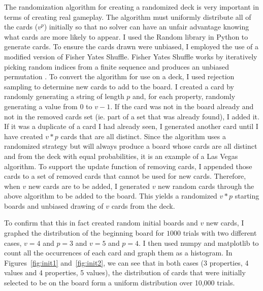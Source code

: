 \documentclass[pageno]{jpaper}
\begin{document}
The randomization algorithm for creating a randomized deck is very important in terms of creating real gameplay. The algorithm must uniformly distribute all of the cards ($v^p$) initially so that no solver can have an unfair advantage knowing what cards are more likely to appear. I used the Random library in Python to generate cards. To ensure the cards drawn were unbiased, I employed the use of a modified version of Fisher Yates Shuffle. Fisher Yates Shuffle works by iteratively picking random indices from a finite sequence and produces an unbiased permutation \cite{fisher}. To convert the algorithm for use on a deck, I used rejection sampling to determine new cards to add to the board. I created a card by randomly generating a string of length $p$ and, for each property, randomly generating a value from $0$ to $v-1$. If the card was not in the board already and not in the removed cards set (ie. part of a set that was already found), I added it. If it was a duplicate of a card I had already seen, I generated another card until I have created $v*p$ cards that are all distinct. Since the algorithm uses a randomized strategy but will always produce a board whose cards are all distinct and from the deck with equal probabilities, it is an example of a Las Vegas algorithm. To support the update function of removing cards, I appended those cards to a set of removed cards that cannot be used for new cards. Therefore, when $v$ new cards are to be added, I generated $v$ new random cards through the above algorithm to be added to the board. This yields a randomized $v*p$ starting boards and unbiased drawing of $v$ cards from the deck.

To confirm that this in fact created random initial boards and $v$ new cards, I graphed the distribution of the beginning board for $1000$ trials with two different cases, $v=4$ and $p=3$ and $v=5$ and $p=4$. I then used numpy and matplotlib to count all the occurrences of each card and graph them as a histogram. In Figures~\ref{fig:init1}  and~\ref{fig:init2}, we can see that in both cases (3 properties, 4 values and 4 properties, 5 values), the distribution of cards that were initially selected to be on the board form a uniform distribution over 10,000 trials.
\end{document}
